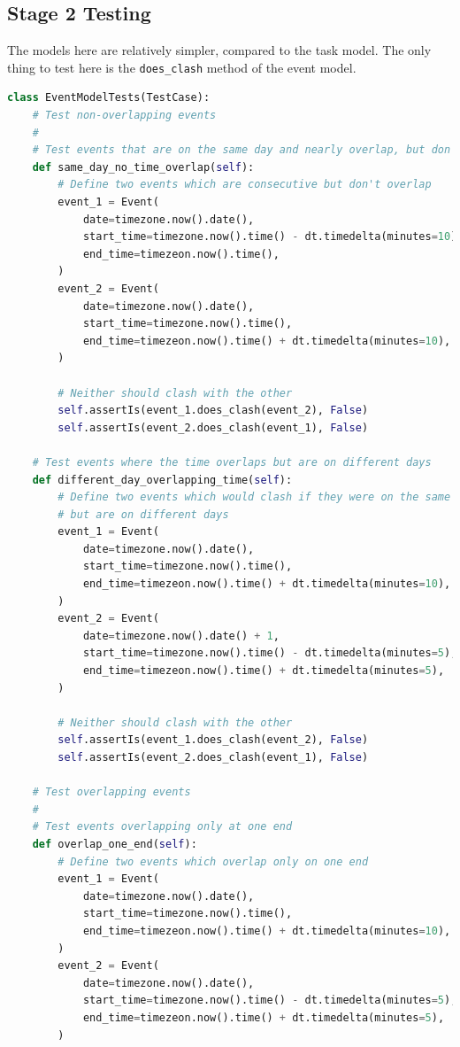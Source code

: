 \documentclass{article}
\begin{document}
\subsection{Stage 2 Testing}
The models here are relatively simpler,
compared to the task model.
The only thing to test here is the \texttt{does\_clash} method of the event model.

\begin{lstlisting}[language=Python]
class EventModelTests(TestCase):
    # Test non-overlapping events
    #
    # Test events that are on the same day and nearly overlap, but don't
    def same_day_no_time_overlap(self):
        # Define two events which are consecutive but don't overlap
        event_1 = Event(
            date=timezone.now().date(),
            start_time=timezone.now().time() - dt.timedelta(minutes=10),
            end_time=timezeon.now().time(),
        )
        event_2 = Event(
            date=timezone.now().date(),
            start_time=timezone.now().time(),
            end_time=timezeon.now().time() + dt.timedelta(minutes=10),
        )

        # Neither should clash with the other
        self.assertIs(event_1.does_clash(event_2), False)
        self.assertIs(event_2.does_clash(event_1), False)

    # Test events where the time overlaps but are on different days
    def different_day_overlapping_time(self):
        # Define two events which would clash if they were on the same day,
        # but are on different days
        event_1 = Event(
            date=timezone.now().date(),
            start_time=timezone.now().time(),
            end_time=timezeon.now().time() + dt.timedelta(minutes=10),
        )
        event_2 = Event(
            date=timezone.now().date() + 1,
            start_time=timezone.now().time() - dt.timedelta(minutes=5),
            end_time=timezeon.now().time() + dt.timedelta(minutes=5),
        )

        # Neither should clash with the other
        self.assertIs(event_1.does_clash(event_2), False)
        self.assertIs(event_2.does_clash(event_1), False)

    # Test overlapping events
    #
    # Test events overlapping only at one end
    def overlap_one_end(self):
        # Define two events which overlap only on one end
        event_1 = Event(
            date=timezone.now().date(),
            start_time=timezone.now().time(),
            end_time=timezeon.now().time() + dt.timedelta(minutes=10),
        )
        event_2 = Event(
            date=timezone.now().date(),
            start_time=timezone.now().time() - dt.timedelta(minutes=5),
            end_time=timezeon.now().time() + dt.timedelta(minutes=5),
        )


\end{lstlisting}
\end{document}
